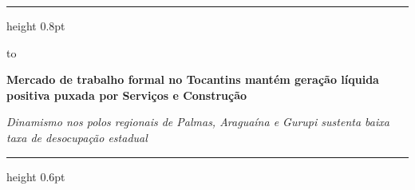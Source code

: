 \documentclass[10pt,a4paper]{article}
\begin{document}
\color{cinzatexto}

%
\par\vspace{2pt}%
{\color{douradoto}\hrule height 0.8pt}%
\par\vspace{6pt}%
\noindent\hbox to %
\par\vspace{5pt}%
{\fontsize{14.5}{17.4}\selectfont\bfseries\color{corprimaria}Mercado de trabalho formal no Tocantins mantém geração líquida positiva puxada por Serviços e Construção\par}%
\vspace{3pt}%
{\footnotesize\itshape\color{cinzasub}Dinamismo nos polos regionais de Palmas, Araguaína e Gurupi sustenta baixa taxa de desocupação estadual\par}%
\par\vspace{6pt}%
{\color{cinzaborda}\hrule height 0.6pt}%

\vspace{0.14cm}
\end{document}
